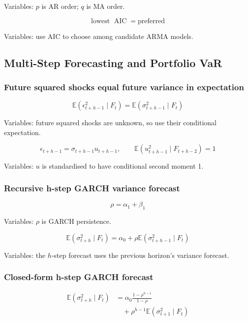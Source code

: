 \documentclass[
  8pt,
  twocolumn]{extarticle}
\begin{document}
Variables: \(p\) is AR order; \(q\) is MA order.

\[
\text{lowest }\operatorname{AIC}=\text{preferred}
\]

Variables: use AIC to choose among candidate ARMA models.

\subsection{Multi-Step Forecasting and Portfolio
VaR}\label{multi-step-forecasting-and-portfolio-var}

\subsubsection{Future squared shocks equal future variance in
expectation}\label{future-squared-shocks-equal-future-variance-in-expectation}

\[
\mathbb E(\epsilon_{t+h-1}^2\mid F_t)=\mathbb E(\sigma_{t+h-1}^2\mid F_t)
\]

Variables: future squared shocks are unknown, so use their conditional
expectation.

\[
\epsilon_{t+h-1}=\sigma_{t+h-1}u_{t+h-1},\qquad \mathbb E(u_{t+h-1}^2\mid F_{t+h-2})=1
\]

Variables: \(u\) is standardised to have conditional second moment 1.

\subsubsection{Recursive h-step GARCH variance
forecast}\label{recursive-h-step-garch-variance-forecast}

\[
\rho=\alpha_1+\beta_1
\]

Variables: \(\rho\) is GARCH persistence.

\[
\mathbb E(\sigma_{t+h}^2\mid F_t)=\alpha_0+\rho\mathbb E(\sigma_{t+h-1}^2\mid F_t)
\]

Variables: the \(h\)-step forecast uses the previous horizon's variance
forecast.

\subsubsection{Closed-form h-step GARCH
forecast}\label{closed-form-h-step-garch-forecast}

\[
\begin{aligned}
\mathbb E(\sigma_{t+h}^2\mid F_t)
&=\alpha_0\frac{1-\rho^{h-1}}{1-\rho}\\
&\quad+\rho^{h-1}\mathbb E(\sigma_{t+1}^2\mid F_t)
\end{aligned}
\]
\end{document}
